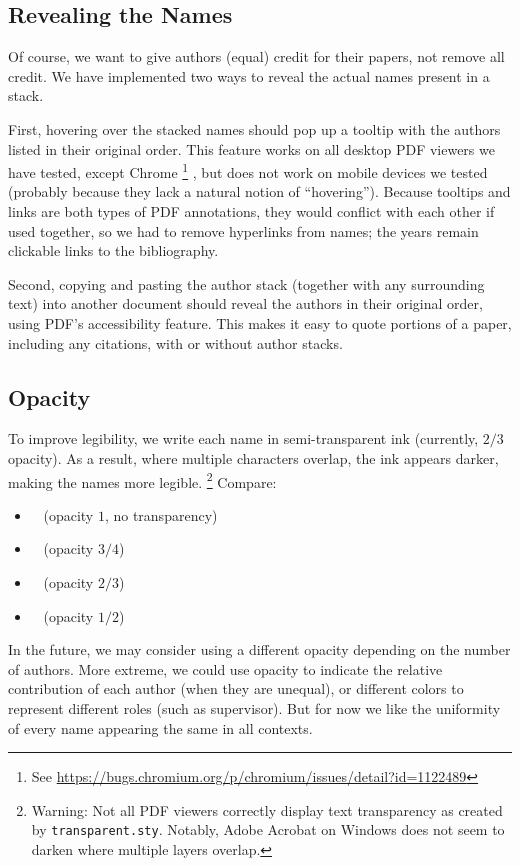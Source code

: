 \documentclass[natbib,authoryear]{sigtbd17-style}
\begin{document}
\subsection{Revealing the Names}

Of course, we want to give authors (equal) credit for their papers,
not remove all credit.
We have implemented two ways to reveal the actual names present in a stack.

First, hovering over the stacked names should pop up a tooltip with the
authors listed in their original order.
This feature works on all desktop PDF viewers we have tested,
except Chrome%
\footnote{See \url{https://bugs.chromium.org/p/chromium/issues/detail?id=1122489}}%
, but does not work on mobile devices we tested
(probably because they lack a natural notion of ``hovering'').
Because tooltips and links are both types of PDF annotations, they would
conflict with each other if used together, so we had to remove hyperlinks
from names; the years remain clickable links to the bibliography.

Second, copying and pasting the author stack (together with any surrounding
text) into another document should reveal the authors in their original order,
using PDF's accessibility feature.  This makes it easy to quote portions of
a paper, including any citations, with or without author stacks.

\subsection{Opacity}

To improve legibility, we write each name in semi-transparent ink
(currently, $2/3$ opacity).
As a result, where multiple characters overlap, the ink appears darker,
making the names more legible.%
%
\footnote{Warning: Not all PDF viewers correctly display text transparency
  as created by \texttt{transparent.sty}.  Notably, Adobe Acrobat on Windows
  does not seem to darken where multiple layers overlap.}
%
Compare:
%
\begin{itemize}
\item {} ~ (opacity $1$, no transparency)
\item {} ~ (opacity $3/4$)
\item {} ~ (opacity $2/3$)
\item {} ~ (opacity $1/2$)
\end{itemize}
%
In the future, we may consider using a different opacity depending on the
number of authors.  More extreme, we could use opacity to indicate the
relative contribution of each author (when they are unequal), or different
colors to represent different roles (such as supervisor).
But for now we like the uniformity of every name
appearing the same in all contexts.
\end{document}
